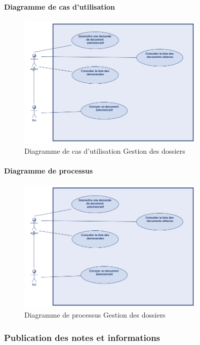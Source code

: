 \paragraph{Diagramme de cas d'utilisation}
\begin{figure}[H]
    \centering
    \includegraphics[width=0.8\textwidth]{images/diagrammes/use-cases/dossiers.png}
    \caption{Diagramme de cas d'utilisation Gestion des dossiers}
    \label{fig:use_case_gestion_dossiers}
\end{figure}

\paragraph{Diagramme de processus}
\begin{figure}[H]
    \centering
    \includegraphics[width=0.8\textwidth]{images/diagrammes/flowcharts/dossiers.png}
    \caption{Diagramme de processus Gestion des dossiers}
    \label{fig:flow_gestion_dossiers}
\end{figure}

\subsubsection{Publication des notes et informations}
